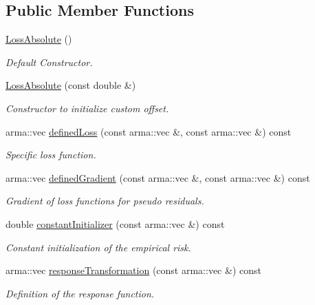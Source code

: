 \subsection*{Public Member Functions}
\begin{DoxyCompactItemize}
\item 
\mbox{\hyperlink{classloss_1_1_loss_absolute_a7da079d5e12d8970854d10f787fa9602}{Loss\+Absolute}} ()
\begin{DoxyCompactList}\small\item\em Default Constructor. \end{DoxyCompactList}\item 
\mbox{\hyperlink{classloss_1_1_loss_absolute_a5b4faa92b976121bcc5cb6938015ac36}{Loss\+Absolute}} (const double \&)
\begin{DoxyCompactList}\small\item\em Constructor to initialize custom offset. \end{DoxyCompactList}\item 
arma\+::vec \mbox{\hyperlink{classloss_1_1_loss_absolute_af10b320d7253ef4f566530717441059e}{defined\+Loss}} (const arma\+::vec \&, const arma\+::vec \&) const
\begin{DoxyCompactList}\small\item\em Specific loss function. \end{DoxyCompactList}\item 
arma\+::vec \mbox{\hyperlink{classloss_1_1_loss_absolute_a89e530450e42f20fc060ed9141fa8c04}{defined\+Gradient}} (const arma\+::vec \&, const arma\+::vec \&) const
\begin{DoxyCompactList}\small\item\em Gradient of loss functions for pseudo residuals. \end{DoxyCompactList}\item 
double \mbox{\hyperlink{classloss_1_1_loss_absolute_a5272a952bf768a7bd790318b2f9cdcd6}{constant\+Initializer}} (const arma\+::vec \&) const
\begin{DoxyCompactList}\small\item\em Constant initialization of the empirical risk. \end{DoxyCompactList}\item 
arma\+::vec \mbox{\hyperlink{classloss_1_1_loss_absolute_a490d0fdab3e1af9cddbca77b8170263a}{response\+Transformation}} (const arma\+::vec \&) const
\begin{DoxyCompactList}\small\item\em Definition of the response function. \end{DoxyCompactList}\end{DoxyCompactItemize}
